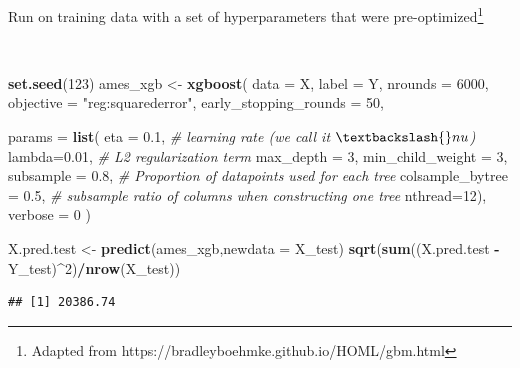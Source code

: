 \documentclass[
  10pt,
  ignorenonframetext,
]{beamer}
\newenvironment{Shaded}{\begin{snugshade}}{\end{snugshade}}
\newcommand{\AttributeTok}[1]{\textcolor[rgb]{0.13,0.29,0.53}{#1}}
\newcommand{\CommentTok}[1]{\textcolor[rgb]{0.56,0.35,0.01}{\textit{#1}}}
\newcommand{\DecValTok}[1]{\textcolor[rgb]{0.00,0.00,0.81}{#1}}
\newcommand{\FloatTok}[1]{\textcolor[rgb]{0.00,0.00,0.81}{#1}}
\newcommand{\FunctionTok}[1]{\textcolor[rgb]{0.13,0.29,0.53}{\textbf{#1}}}
\newcommand{\NormalTok}[1]{#1}
\newcommand{\OtherTok}[1]{\textcolor[rgb]{0.56,0.35,0.01}{#1}}
\newcommand{\SpecialCharTok}[1]{\textcolor[rgb]{0.81,0.36,0.00}{\textbf{#1}}}
\newcommand{\StringTok}[1]{\textcolor[rgb]{0.31,0.60,0.02}{#1}}
\begin{document}
\begin{frame}[fragile]
Run on training data with a set of hyperparameters that were
pre-optimized\footnote{Adapted from https://bradleyboehmke.github.io/HOML/gbm.html}

\(~\)

\scriptsize

\begin{Shaded}
\begin{Highlighting}[]
\FunctionTok{set.seed}\NormalTok{(}\DecValTok{123}\NormalTok{)}
\NormalTok{ames\_xgb }\OtherTok{\textless{}{-}} \FunctionTok{xgboost}\NormalTok{(}
  \AttributeTok{data =}\NormalTok{ X,}
  \AttributeTok{label =}\NormalTok{ Y,}
  \AttributeTok{nrounds =} \DecValTok{6000}\NormalTok{,}
  \AttributeTok{objective =} \StringTok{"reg:squarederror"}\NormalTok{,}
  \AttributeTok{early\_stopping\_rounds =} \DecValTok{50}\NormalTok{,   }
  
  \AttributeTok{params =} \FunctionTok{list}\NormalTok{( }
    \AttributeTok{eta =} \FloatTok{0.1}\NormalTok{, }\CommentTok{\# learning rate (we call it $\textbackslash{}nu$)}
    \AttributeTok{lambda=}\FloatTok{0.01}\NormalTok{, }\CommentTok{\# L2 regularization term}
    \AttributeTok{max\_depth =} \DecValTok{3}\NormalTok{,}
    \AttributeTok{min\_child\_weight =} \DecValTok{3}\NormalTok{,}
    \AttributeTok{subsample =} \FloatTok{0.8}\NormalTok{, }\CommentTok{\# Proportion of datapoints used for each tree}
    \AttributeTok{colsample\_bytree =} \FloatTok{0.5}\NormalTok{, }\CommentTok{\# subsample ratio of columns when constructing one tree}
    \AttributeTok{nthread=}\DecValTok{12}\NormalTok{),}
  \AttributeTok{verbose =} \DecValTok{0}
\NormalTok{)  }
\end{Highlighting}
\end{Shaded}

\begin{Shaded}
\begin{Highlighting}[]
\NormalTok{X.pred.test }\OtherTok{\textless{}{-}} \FunctionTok{predict}\NormalTok{(ames\_xgb,}\AttributeTok{newdata =}\NormalTok{ X\_test)}
\FunctionTok{sqrt}\NormalTok{(}\FunctionTok{sum}\NormalTok{((X.pred.test }\SpecialCharTok{{-}}\NormalTok{ Y\_test)}\SpecialCharTok{\^{}}\DecValTok{2}\NormalTok{)}\SpecialCharTok{/}\FunctionTok{nrow}\NormalTok{(X\_test))}
\end{Highlighting}
\end{Shaded}

\begin{verbatim}
## [1] 20386.74
\end{verbatim}
\end{frame}
\end{document}
